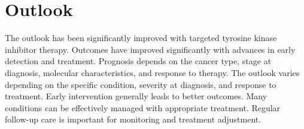 \section{Outlook}
The outlook has been significantly improved with targeted tyrosine kinase inhibitor therapy. Outcomes have improved significantly with advances in early detection and treatment. Prognosis depends on the cancer type, stage at diagnosis, molecular characteristics, and response to therapy. The outlook varies depending on the specific condition, severity at diagnosis, and response to treatment. Early intervention generally leads to better outcomes. Many conditions can be effectively managed with appropriate treatment. Regular follow-up care is important for monitoring and treatment adjustment.
